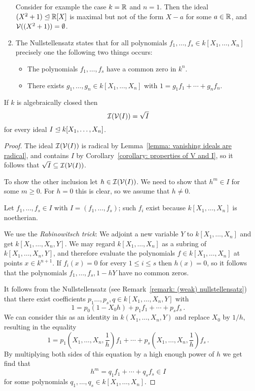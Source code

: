 \begin{remark}
\begin{enumerate}
      Consider for example the case $k = \mathbb{R}$ and $n = 1$.
      Then the ideal $(X^2 + 1) \trianglelefteq \mathbb{R}[X]$ is maximal but not of the form $X - a$ for some $a \in \mathbb{R}$, and $\mathcal{V}((X^2 + 1)) = \emptyset$.
    \item
      The Nullstellensatz states that for all polynomials $f_1, \dotsc, f_s \in k[X_1, \dotsc, X_n]$ precisely one the following two things occurs:
      \begin{itemize}
        \item
          The polynomials $f_1, \dotsc, f_s$ have a common zero in $k^n$.
        \item
          There exists $g_1, \dotsc, g_n \in k[X_1, \dotsc, X_n]$ with $1 = g_1 f_1 + \dotsb + g_n f_n$.
      \end{itemize}
  \end{enumerate}
\end{remark}


\begin{corollary}
  If $k$ is algebraically closed then
  \[
      \mathcal{I}(\mathcal{V}(I))
    = \sqrt{I}
  \]
  for every ideal $I \trianglelefteq k[X_1, \dotsc, X_n]$.
\end{corollary}
\begin{proof}
  The ideal $\mathcal{I}(\mathcal{V}(I))$ is radical by Lemma~\ref{lemma: vanishing ideals are radical}, and contains $I$ by Corollary~\ref{corollary: properties of V and I}, so it follows that $\sqrt{I} \subseteq \mathcal{I}(\mathcal{V}(I))$.
  
  To show the other inclusion let $h \in \mathcal{I}(\mathcal{V}(I))$.
  We need to show that $h^m \in I$ for some $m \geq 0$.
  For $h = 0$ this is clear, so we assume that $h \neq 0$.
  
  Let $f_1, \dotsc, f_s \in I$ with $I = (f_1, \dotsc, f_s)$;
  such $f_i$ exist because  $k[X_1, \dotsc, X_n]$ is noetherian.
  
  We use the \emph{Rabinowitsch trick}:
  We adjoint a new variable $Y$ to $k[X_1, \dotsc, X_n]$ and get $k[X_1, \dotsc, X_n, Y]$.
  We may regard $k[X_1, \dotsc, X_n]$ as a subring of $k[X_1, \dotsc, X_n, Y]$, and therefore evaluate the polynomials $f \in k[X_1, \dotsc, X_n]$ at points $x \in k^{n+1}$.
  If $f_i(x) = 0$ for every $1 \leq i \leq s$ then $h(x) = 0$, so it follows that the polynomials $f_1, \dotsc, f_s, 1 - h Y$ have no common zeros.
  
  It follows from the Nullstellensatz (see Remark~\ref{remark: (weak) nullstellensatz}) that there exist coefficients $p_1 \ldots, p_s, q \in k[X_1, \dotsc, X_n, Y]$ with
  \[
      1
    = p_0 (1 - X_0 h) + p_1 f_1 + \dotsb + p_s f_s \,.
  \]
  We can consider this as an identity in $k(X_1, \dotsc, X_n, Y)$ and replace $X_0$ by $1/h$, resulting in the equality
  \[
      1
    =   p_1 \left(X_1, \dotsc, X_n, \frac{1}{h} \right) f_1
      + \dotsb
      + p_s \left(X_1, \dotsc, X_n, \frac{1}{h} \right) f_s \,.
  \]
  By multiplying both sides of this equation by a high enough power of $h$ we get find that
  \[
        h^m
    =   q_1 f_1 + \dotsb + q_s f_s
    \in I
  \]
  for some polynomials $q_1, \dotsc, q_s \in k[X_1, \dotsc, X_n]$.
\end{proof}


